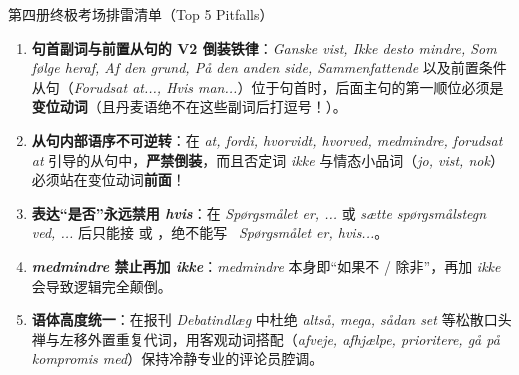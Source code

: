 \begin{grammatikbox}{第四册终极考场排雷清单（Top 5 Pitfalls）}
\begin{enumerate}
  \item \textbf{ 句首副词与前置从句的 V2 倒装铁律}：\textit{Ganske vist, Ikke desto mindre, Som følge heraf, Af den grund, På den anden side, Sammenfattende} 以及前置条件从句（\textit{Forudsat at..., Hvis man...}）位于句首时，后面主句的第一顺位必须是\textbf{变位动词}（且丹麦语绝不在这些副词后打逗号！）。
  \item \textbf{ 从句内部语序不可逆转}：在 \textit{at, fordi, hvorvidt, hvorved, medmindre, forudsat at} 引导的从句中，\textbf{严禁倒装}，而且否定词 \textit{ikke} 与情态小品词（\textit{jo, vist, nok}）必须站在变位动词\textbf{前面}！
  \item \textbf{ 表达“是否”永远禁用 \textit{hvis}}：在 \textit{Spørgsmålet er, ...} 或 \textit{sætte spørgsmålstegn ved, ...} 后只能接  或 ，绝不能写 \ \textit{Spørgsmålet er, hvis...}。
  \item \textbf{ \textit{medmindre} 禁止再加 \textit{ikke}}：\textit{medmindre} 本身即“如果不 / 除非”，再加 \textit{ikke} 会导致逻辑完全颠倒。
  \item \textbf{ 语体高度统一}：在报刊 \textit{Debatindlæg} 中杜绝 \textit{altså, mega, sådan set} 等松散口头禅与左移外置重复代词，用客观动词搭配（\textit{afveje, afhjælpe, prioritere, gå på kompromis med}）保持冷静专业的评论员腔调。
\end{enumerate}
\end{grammatikbox}


